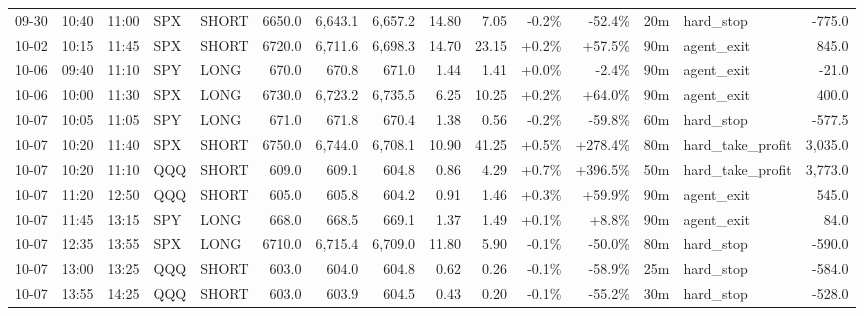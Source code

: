 \documentclass[11pt,a4paper,twoside]{article}
\begin{document}
\begin{landscape}
\begin{center}
\begin{longtable}{>{\color{txtmain}}l l l l l r r r r r r r r >{\color{txtmain}}l r}
09-30 & 10:40 & 11:00 & SPX & SHORT & 6650.0 & 6,643.1 & 6,657.2 & 14.80 & 7.05 & \textcolor{lossred}{-0.2\%} & \textcolor{lossred}{-52.4\%} & 20m & hard\_stop & \textcolor{lossred}{-775.0} \\
10-02 & 10:15 & 11:45 & SPX & SHORT & 6720.0 & 6,711.6 & 6,698.3 & 14.70 & 23.15 & \textcolor{wingreen}{+0.2\%} & \textcolor{wingreen}{+57.5\%} & 90m & agent\_exit & \textcolor{wingreen}{845.0} \\
10-06 & 09:40 & 11:10 & SPY & LONG & 670.0 & 670.8 & 671.0 & 1.44 & 1.41 & \textcolor{wingreen}{+0.0\%} & \textcolor{lossred}{-2.4\%} & 90m & agent\_exit & \textcolor{lossred}{-21.0} \\
10-06 & 10:00 & 11:30 & SPX & LONG & 6730.0 & 6,723.2 & 6,735.5 & 6.25 & 10.25 & \textcolor{wingreen}{+0.2\%} & \textcolor{wingreen}{+64.0\%} & 90m & agent\_exit & \textcolor{wingreen}{400.0} \\
10-07 & 10:05 & 11:05 & SPY & LONG & 671.0 & 671.8 & 670.4 & 1.38 & 0.56 & \textcolor{lossred}{-0.2\%} & \textcolor{lossred}{-59.8\%} & 60m & hard\_stop & \textcolor{lossred}{-577.5} \\
10-07 & 10:20 & 11:40 & SPX & SHORT & 6750.0 & 6,744.0 & 6,708.1 & 10.90 & 41.25 & \textcolor{wingreen}{+0.5\%} & \textcolor{wingreen}{+278.4\%} & 80m & hard\_take\_profit & \textcolor{wingreen}{3,035.0} \\
10-07 & 10:20 & 11:10 & QQQ & SHORT & 609.0 & 609.1 & 604.8 & 0.86 & 4.29 & \textcolor{wingreen}{+0.7\%} & \textcolor{wingreen}{+396.5\%} & 50m & hard\_take\_profit & \textcolor{wingreen}{3,773.0} \\
10-07 & 11:20 & 12:50 & QQQ & SHORT & 605.0 & 605.8 & 604.2 & 0.91 & 1.46 & \textcolor{wingreen}{+0.3\%} & \textcolor{wingreen}{+59.9\%} & 90m & agent\_exit & \textcolor{wingreen}{545.0} \\
10-07 & 11:45 & 13:15 & SPY & LONG & 668.0 & 668.5 & 669.1 & 1.37 & 1.49 & \textcolor{wingreen}{+0.1\%} & \textcolor{wingreen}{+8.8\%} & 90m & agent\_exit & \textcolor{wingreen}{84.0} \\
10-07 & 12:35 & 13:55 & SPX & LONG & 6710.0 & 6,715.4 & 6,709.0 & 11.80 & 5.90 & \textcolor{lossred}{-0.1\%} & \textcolor{lossred}{-50.0\%} & 80m & hard\_stop & \textcolor{lossred}{-590.0} \\
10-07 & 13:00 & 13:25 & QQQ & SHORT & 603.0 & 604.0 & 604.8 & 0.62 & 0.26 & \textcolor{lossred}{-0.1\%} & \textcolor{lossred}{-58.9\%} & 25m & hard\_stop & \textcolor{lossred}{-584.0} \\
10-07 & 13:55 & 14:25 & QQQ & SHORT & 603.0 & 603.9 & 604.5 & 0.43 & 0.20 & \textcolor{lossred}{-0.1\%} & \textcolor{lossred}{-55.2\%} & 30m & hard\_stop & \textcolor{lossred}{-528.0} \\

\end{longtable}
\end{center}
\end{landscape}
\end{document}
